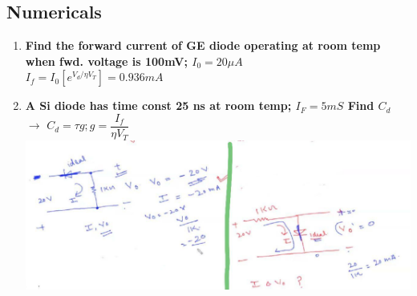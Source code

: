 \documentclass[10pt, a4paper]{report}
\begin{document}
	\subsection{Numericals}
	\begin{enumerate}
		\item \textbf{Find the forward current of GE diode operating at room temp when fwd. voltage is 100mV; $ I_0 = 20\mu A $ }\\
		$ I_f = I_0[ e^{V_d/\eta V_T}]  = 0.936mA$
		\item \textbf{A Si diode has time const 25 ns at room temp; $ I_F = 5mS $ Find $ C_d $} \\
		$\rightarrow$ $ C_d = \tau g; g = \dfrac{I_f}{\eta V_T} $ \\
		\includegraphics[width=\linewidth]{img/numericals 2nd jan}
	\end{enumerate}
\end{document}
